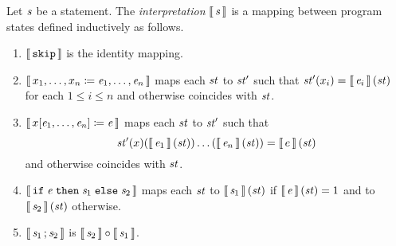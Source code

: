 \begin{definition}\label{def:boogie/interpret-statement}
Let $\stmt$ be a statement. The \emph{interpretation} $\interp{\stmt}$ is a mapping between program states defined inductively as follows.
\begin{enumerate}
  \item $\interp{\emptyStatement}$ is the identity mapping.
  \item $\interp{\assigns{x_1,\ldots,x_n}{\expr_1,\ldots,\expr_n}}$ maps each $\State$ to $\State'$ such that $\State'(x_i)=\interp{\expr_i}(\State)$ for each $1 \le i \le n$ and otherwise coincides with $\State$.
  \item $\interp{\assigns{x[\expr_1,\ldots,\expr_n]}{\expr}}$ maps each $\State$ to $\State'$ such that $$\State'(x)(\interp{\expr_1}(\State))\ldots(\interp{\expr_n}(\State))=\interp{e}(\State)$$ and otherwise coincides with $\State$.
  \item $\interp{\ite{\expr}{\stmt_1}{\stmt_2}}$ maps each $\State$ to $\interp{\stmt_1}(\State)$ if $\interp{\expr}(\State)=1$ and to $\interp{\stmt_2}(\State)$ otherwise.
  \item $\interp{\seq{\stmt_1}{\stmt_2}}$ is $\interp{\stmt_2}\circ\interp{\stmt_1}$. \QED  
\end{enumerate}
\end{definition}


